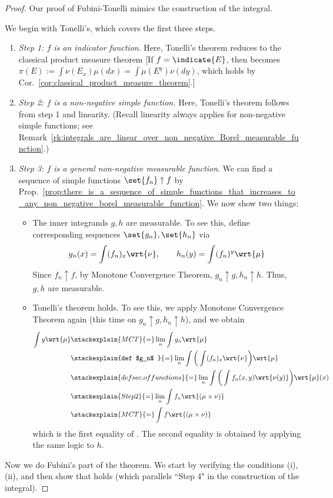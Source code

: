 \documentclass{article} %
\newcommand{\dmu}{\wrt{\mu}}
\begin{document}
\begin{proof}
Our proof of Fubini-Tonelli mimics the construction of the integral.   

We begin with Tonelli's, which covers the first three steps.
\begin{enumerate}
\item \textit{Step 1: $f$ is an indicator function}.   Here, Tonelli's theorem reduces to the classical product measure theorem {\tiny  [If $f=\indicate{E}$, then  becomes $\pi(E) := \int \nu(E_x) \mu(dx) = \int \mu(E^y) \nu(dy) $, which holds by   Cor.~\ref{cor:classical_product_measure_theorem}.]}   %
\item \textit{Step 2: $f$ is a non-negative simple function.}  Here, Tonelli's theorem follows from step 1 and linearity. {\tiny (Recall linearity always applies for non-negative simple functions; see Remark~\ref{rk:integrals_are_linear_over_non_negative_Borel_measurable_function}.)}  
\item \textit{Step 3: $f$ is a general non-negative measurable function}.  We can find a sequence of simple functions $\set{f_n} \uparrow f$ by Prop.~\ref{prop:there_is_a_sequence_of_simple_functions_that_increases_to_any_non_negative_borel_measurable_function}.   We now show two things:
	\begin{itemize}
	\item The inner integrands $g, h$ are measurable. To see this, define corresponding sequences $\set{g_n}, \set{h_n}$ via 
	\[ g_n(x) = \int (f_n)_x \wrt{\nu}, \quad \quad h_n(y) = \int (f_n)^y \wrt{\mu} \]
	Since $f_n \uparrow f$, by Monotone Convergence Theorem, $g_n \uparrow g, h_n \uparrow h$. Thus, $g, h$ are measurable. 
	\item Tonelli's theorem holds.  To see this, we apply Monotone Convergence Theorem again {\tiny (this time on $g_n \uparrow g, h_n \uparrow h$)}, and we obtain 
	\begin{align*}
	\int g \dmu & \stackexplain{MCT
	}{=} \lim_n \int g_n \dmu  \\
	&\stackexplain{def $g_n$
	}{=}\lim_n \int \bigg( \int (f_n)_x \wrt{\nu} \bigg) \dmu \\
	& \stackexplain{def sec. of functions}{=} \lim_n \int \bigg( \int f_n(x,y) \wrt{\nu(y)} \bigg) \dmu(x) \\
	& \stackexplain{Step 2}{=} \lim_n \int f_n \wrt{(\mu \times \nu)} \\
	& \stackexplain{MCT}{=} \int f \wrt{(\mu \times \nu)}
	\end{align*}
	which is the first equality of .  The second equality is obtained by applying the same logic to $h$. 
	\end{itemize}
\end{enumerate}
Now we do Fubini's part of the theorem.  We start by verifying the conditions (i),(ii), and then show that  holds (which parallels ``Step 4" in the construction of the integral).


\end{proof}
\end{document}
